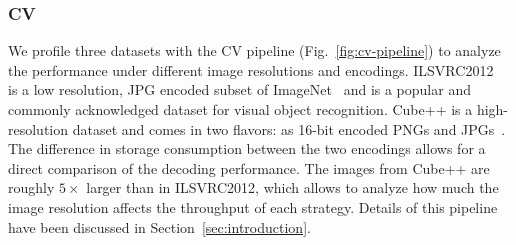 \vspace{-0.5cm}
\begin{table}[h]
\caption{Metadata of all profiled datasets.}
\label{tab:experiments:dataset-info}
\end{table}
\vspace{-0.8cm}

\subsubsection{CV}

{\color{diff}We profile three datasets with the CV pipeline (Fig.~\ref{fig:cv-pipeline}) to analyze the performance under different image resolutions and encodings. 
ILSVRC2012~\cite{ILSVRC15} is a low resolution, JPG encoded subset of ImageNet~\cite{deng2009imagenet} and is a popular and commonly acknowledged dataset for visual object recognition.
Cube++ is a high-resolution dataset and comes in two flavors: as 16-bit encoded PNGs and JPGs~\cite{ershov2020cube}.
The difference in storage consumption between the two encodings allows for a direct comparison of the decoding performance.
The images from Cube++ are roughly $5\times$ larger than in ILSVRC2012, which allows to analyze how much the image resolution affects the throughput of each strategy.}
Details of this pipeline have been discussed in Section~\ref{sec:introduction}.

